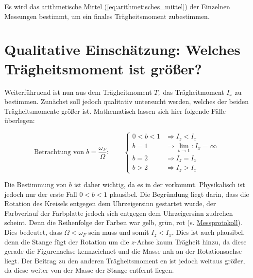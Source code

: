 Es wird das \hyperref[eq:arithmetisches_mittel]{arithmetische Mittel (\ref*{eq:arithmetisches_mittel})} der Einzelnen Messungen bestimmt, um ein finales Trägheitsmoment zubestimmen.

 \label{eq:res_i_z}




\section{Qualitative Einschätzung: Welches Trägheitsmoment  ist größer?}
\label{sec:A4}
Weiterführuend ist nun aus dem Trägheitmoment $T_z$ das Trägheitmoment $I_x$ zu bestimmen. Zunächst soll jedoch qualitativ untersucht werden, welches der beiden Trägheitsmomente größer ist.
Mathematisch lassen sich hier folgende Fälle überlegen:

\[
    \text{Betrachtung von } b = \frac{\omega_F}{\Omega}:
    \qquad
    \begin{cases}
    0 < b < 1   &\Rightarrow I_z < I_x \\[2pt]
    b = 1       &\Rightarrow \lim_{b \to 1}: I_x = \infty \\[2pt]
    b = 2       &\Rightarrow I_z = I_x \\[2pt]
    b > 2       &\Rightarrow I_z > I_x
    \end{cases}
\]

Die Bestimmung von $b$ ist daher wichtig, da es in der  vorkommt. Physikalisch ist jedoch nur der erste Fall $0 < b < 1$ plausibel. 
Die Begründung liegt darin, dass die Rotation des Kreisels entgegen dem Uhrzeigersinn gestartet wurde, der Farbverlauf der Farbplatte jedoch sich entgegen dem Uhrzeigersinn zudrehen scheint. Denn die Reihenfolge der Farben war gelb, grün, rot (s. \hyperref[ch:Protokoll]{Messprotokoll}).
Dies bedeutet, dass $\Omega < \omega_F$ sein muss und somit $I_z < I_x$. Dies ist auch plausibel, denn die Stange fügt der Rotation um die $z$-Achse kaum Trägheit hinzu, da diese gerade die Figurenachse kennzeichnet und die Masse nah an der Rotationsachse liegt. Der Beitrag zu den anderen Trägheitsmoment en ist jedoch weitaus größer, da diese weiter von der Masse der Stange entfernt liegen.

